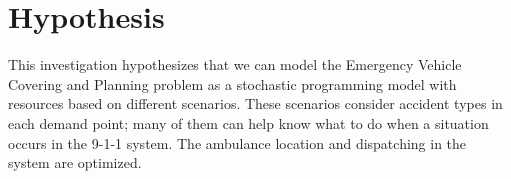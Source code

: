 



\section{Hypothesis}
This investigation hypothesizes that we can model the Emergency Vehicle Covering and Planning problem as a stochastic programming model with resources based on different scenarios. These scenarios consider accident types in each demand point; many of them can help know what to do when a situation occurs in the 9-1-1 system. The ambulance location and dispatching in the system are optimized.

